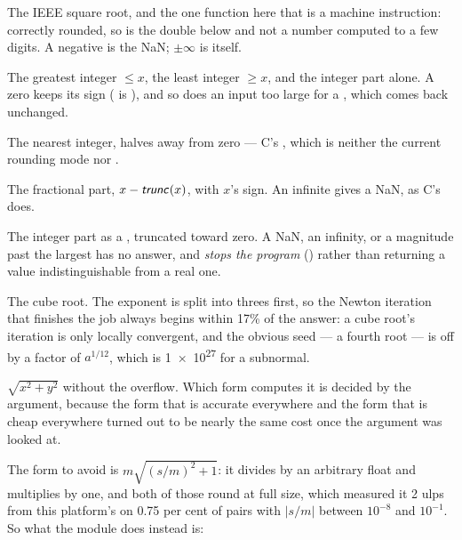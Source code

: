 \begin{description}[style=nextline,leftmargin=5.2em]
\item[\ic{math.sqrt(x)}] The IEEE square root, and the one function here that
  is a machine instruction: correctly rounded, so  is the double
  below and not a number computed to a few digits. A negative  is the
  NaN; $\pm\infty$ is itself.
\item[\ic{math.floor(x)}, \ic{math.ceil(x)}, \ic{math.trunc(x)}] The
  greatest integer $\leq x$, the least integer $\geq x$, and the integer part
  alone. A zero keeps its sign ( is ), and so does an
  input too large for a , which comes back unchanged.
\item[\ic{math.round(x)}] The nearest integer, halves away from zero --- C's
  , which is neither the current rounding mode nor .
\item[\ic{math.fract(x)}] The fractional part, $x-\textsf{\textit{trunc}}(x)$, with
  $x$'s sign. An infinite  gives a NaN, as C's does.
\item[\ic{math.to\_int(x)}] The integer part as a , truncated toward
  zero. A NaN, an infinity, or a magnitude past the largest  has no
  answer, and \emph{stops the program} () rather than returning a value indistinguishable
  from a real one.
\item[\ic{math.cbrt(x)}] The cube root. The exponent is split into threes
  first, so the Newton iteration that finishes the job always begins within
  17\% of the answer: a cube root's iteration is only locally convergent, and
  the obvious seed --- a fourth root --- is off by a factor of $a^{1/12}$, which
  is \num{1e27} for a subnormal.
\item[\ic{math.hypot(x, y)}] $\sqrt{x^2+y^2}$ without the overflow. Which form
  computes it is decided by the argument, because the form that is accurate
  everywhere and the form that is cheap everywhere turned out to be nearly the
  same cost once the argument was looked at.

  The form to avoid is $m\sqrt{(s/m)^2+1}$: it divides by an arbitrary float and
  multiplies by one, and both of those round at full size, which measured it 2
  ulps from this platform's  on \num{0.75} per cent of pairs with
  $|s/m|$ between $10^{-8}$ and $10^{-1}$. So what the module does instead is:


\end{description}
